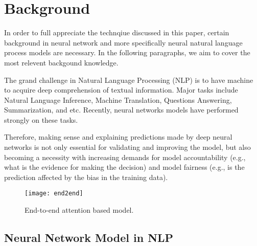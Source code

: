 \section{Background}

In order to full appreciate the technqiue discussed in this paper, certain background
in neural network and more specifically neural natural language process models are necessary.
In the following paragraphs, we aim to cover the most relevent backgound knowledge.


The grand challenge in Natural Language Processing (NLP) is to have machine to acquire
deep comprehension of textual information. Major tasks include Natural Language Inference,
Machine Translation, Questions Answering, Summarization, and etc.
Recently, neural networks models have performed strongly on these tasks.

Therefore, making sense and explaining predictions made by deep neural networks is not only
essential for validating and improving the model, but also becoming a necessity with
increasing demands for model accountability (e.g., what is the evidence for making the decision)
and model fairness (e.g., is the prediction affected by the bias in the training data).



\begin{figure}[htbp]
\centering
\vspace{-2mm}
 \texttt{[image: end2end]}
 \caption{End-to-end attention based model.}
\label{fig:modelPipeline}
\end{figure}

\subsection{Neural Network Model in NLP}

